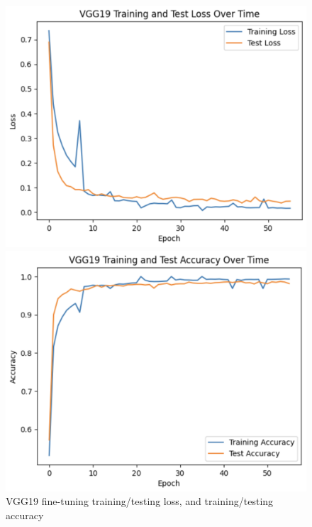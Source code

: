 \documentclass[twocolumn]{article}
\begin{document}
\begin{figure}[H]
\centering
\begin{minipage}{8cm}
\includegraphics[width=\textwidth]{images/vggloss.png}
\end{minipage} \begin{minipage}{8cm}
\includegraphics[width=\textwidth]{images/vggacc.png}
\end{minipage}
\caption{VGG19 fine-tuning training/testing loss, and training/testing accuracy}
\label{fig:vgg19training}
\end{figure}
\end{document}
